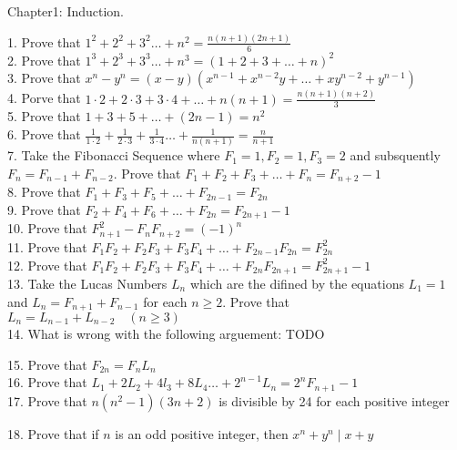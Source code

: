 \documentclass{article}
\begin{document}
Chapter1: Induction.

1. Prove that
$1^2 + 2^2 + 3^2\ldots{} + n^2 = \frac{n(n+1)(2n+1)}{6}$ \\

2. Prove that
$1^3 + 2^3 + 3^3\ldots{} + n^3 = (1 + 2 + 3 + \ldots{} + n)^2$ \\

3. Prove that
$x^n-y^n = (x - y)(x^{n-1} + x^{n-2}y + \ldots{} + xy^{n-2} + y^{n-1})$ \\

4. Porve that
$1\cdot2 + 2\cdot3 + 3\cdot4 + \ldots{} + n(n+1) = \frac{n(n+1)(n+2)}{3}$ \\

5. Prove that
$1 + 3 + 5 + \ldots{} + (2n-1) = n^2 $ \\

6. Prove that
$\frac{1}{1\cdot2} + \frac{1}{2\cdot3}  + \frac{1}{3\cdot4} \ldots{} + \frac{1}{n(n+1)} = \frac{n}{n+1} $ \\

7. Take the Fibonacci Sequence where
$F_1 = 1,F_2 = 1, F_3 = 2$ and subsquently $F_n = F_{n-1} + F_{n-2}$. Prove that $F_1 + F_2 + F_3 + \ldots + F_n = F_{n+2} - 1$ \\

8. Prove that
$F_1 + F_3 + F_5 + \ldots + F_{2n-1} = F_{2n}$ \\

9. Prove that
$F_2 + F_4 + F_6 + \ldots + F_{2n} = F_{2n + 1} - 1$ \\

10. Prove that
$F_{n+1}^2 - F_nF_{n+2} =  (- 1)^n$ \\

11. Prove that
$F_1F_2 + F_2F_3 + F_3F_4 + \ldots + F_{2n - 1}F_{2n} = F_{2n}^2$\\

12. Prove that
$F_1F_2 + F_2F_3 + F_3F_4 + \ldots + F_{2n}F_{2n+1} = F_{2n+1}^2 -1$\\

13. Take the Lucas Numbers $L_n$ which are the difined by the equations $L_1 =1$ and $L_n = F_{n+1} + F_{n-1}$ for each $ n \geq 2$. Prove that $L_n = L_{n-1} + L_{n-2} \quad (n \geq 3)$ \\

14. What is wrong with the following arguement:
TODO

15. Prove that
$F_{2n} = F_nL_n$\\

16. Prove that
$L_1 + 2L_2 + 4l_3 + 8L_4 \ldots + 2^{n-1}L_n = 2^nF_{n+1} - 1$\\

17. Prove that
$n(n^2-1)(3n+2)$ is divisible by 24 for each positive integer

18. Prove that if $n$ is an odd positive integer, then $x^n + y^n \mid x+y$
\end{document}
